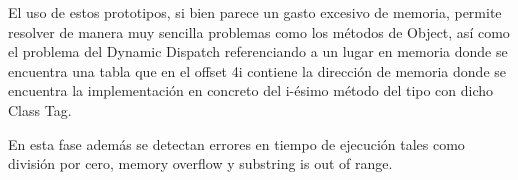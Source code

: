 \documentclass[]{article}
\begin{document}
El uso de estos prototipos, si bien parece un gasto excesivo de memoria, permite resolver de manera muy sencilla problemas como los m\'etodos de Object, as\'i como el problema del Dynamic Dispatch referenciando a un lugar en memoria donde se encuentra una tabla que en el offset 4i contiene la direcci\'on de memoria donde se encuentra la implementaci\'on en concreto del i-\'esimo m\'etodo del tipo con dicho Class Tag.

En esta fase adem\'as se detectan errores en tiempo de ejecuci\'on tales como divisi\'on por cero, memory overflow y substring is out of range.
\end{document}
